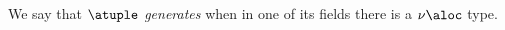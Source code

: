 %
We say that $\atuple$ \emph{generates} when in one of its fields there
is a $\nu \aloc$ type. 
%

%


